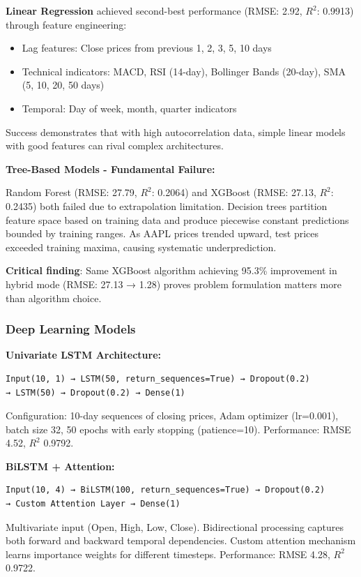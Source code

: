 \textbf{Linear Regression} achieved second-best performance (RMSE: 2.92, $R^2$: 0.9913) through feature engineering:
\begin{itemize}
    \item Lag features: Close prices from previous 1, 2, 3, 5, 10 days
    \item Technical indicators: MACD, RSI (14-day), Bollinger Bands (20-day), SMA (5, 10, 20, 50 days)
    \item Temporal: Day of week, month, quarter indicators  
\end{itemize}

Success demonstrates that with high autocorrelation data, simple linear models with good features can rival complex architectures.

\textbf{Tree-Based Models - Fundamental Failure:}

Random Forest (RMSE: 27.79, $R^2$: 0.2064) and XGBoost (RMSE: 27.13, $R^2$: 0.2435) both failed due to extrapolation limitation. Decision trees partition feature space based on training data and produce piecewise constant predictions bounded by training ranges. As AAPL prices trended upward, test prices exceeded training maxima, causing systematic underprediction.

\textbf{Critical finding}: Same XGBoost algorithm achieving 95.3\% improvement in hybrid mode (RMSE: 27.13 → 1.28) proves problem formulation matters more than algorithm choice.

\subsubsection{Deep Learning Models}

\textbf{Univariate LSTM Architecture:}
\begin{verbatim}
Input(10, 1) → LSTM(50, return_sequences=True) → Dropout(0.2)
→ LSTM(50) → Dropout(0.2) → Dense(1)
\end{verbatim}

Configuration: 10-day sequences of closing prices, Adam optimizer (lr=0.001), batch size 32, 50 epochs with early stopping (patience=10). Performance: RMSE 4.52, $R^2$ 0.9792.

\textbf{BiLSTM + Attention:}
\begin{verbatim}
Input(10, 4) → BiLSTM(100, return_sequences=True) → Dropout(0.2)
→ Custom Attention Layer → Dense(1)
\end{verbatim}

Multivariate input (Open, High, Low, Close). Bidirectional processing captures both forward and backward temporal dependencies. Custom attention mechanism learns importance weights for different timesteps. Performance: RMSE 4.28, $R^2$ 0.9722.

